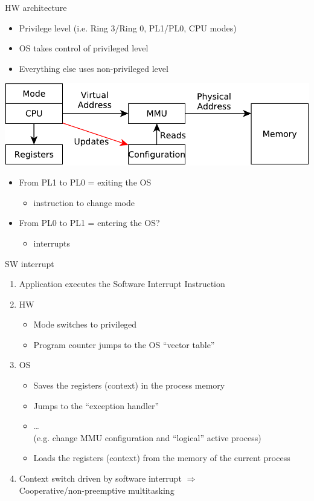 \documentclass{beamer}
\begin{document}
\begin{frame}{HW architecture}
  \begin{itemize}
  \item Privilege level (i.e. Ring 3/Ring 0, PL1/PL0, CPU modes)
  \item OS takes control of privileged level
  \item Everything else uses non-privileged level
  \end{itemize}
  \begin{center}
  \includegraphics[width=0.5\linewidth]{mode0}
  \end{center}
  \begin{itemize}
  \item<2-> From PL1 to PL0 = exiting the OS
  \begin{itemize}
    \item instruction to change mode
  \end{itemize}
  \item<3-> From PL0 to PL1 = entering the OS?
  \begin{itemize}
    \item<4-> interrupts
  \end{itemize}
  \end{itemize}
\end{frame}



\begin{frame}{SW interrupt}
  \begin{enumerate}
  \item<1-> Application executes the Software Interrupt Instruction
  \item<2-> HW
  \begin{itemize}
    \item Mode switches to privileged
    \item Program counter jumps to the OS ``vector table''
  \end{itemize}
  \item<3-> OS
  \begin{itemize}
    \item Saves the registers (context) in the process memory
    \item Jumps to the ``exception handler''
    \item \dots \\
 (e.g. change MMU configuration and ``logical'' active process)
    \item Loads the registers (context) from the memory of the  \alert{current}
      process
  \end{itemize}
  \item<4-> Context switch driven by software interrupt $\Rightarrow$\\
    Cooperative/non-preemptive multitasking
\end{enumerate}
\end{frame}
\end{document}
